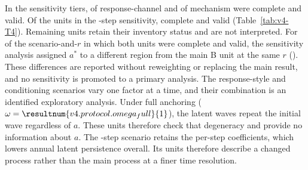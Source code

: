 In the sensitivity tiers,  of  response-channel  and  of  mechanism  were complete and valid. Of the  units in the -step sensitivity,   complete and valid (Table~\ref{tab:v4-T4}).  %
Remaining units retain their inventory status and are not interpreted. %
For  of the  scenario-and-$r$  in which both units were complete and valid, the sensitivity analysis assigned $a^*$ to a different region from the main B unit at the same $r$ (\allunitsresource). %
These differences are reported without reweighting or replacing the main result, and no sensitivity is promoted to a primary analysis. %
The response-style and conditioning scenarios vary one factor at a time, and their combination is an identified exploratory analysis. %
Under full anchoring ($\omega=\resultnum{v4.protocol.omega_full}{1}$), the latent waves repeat the initial wave regardless of $a$. These units therefore check that degeneracy and provide no information about $a$. %
The -step scenario retains the per-step coefficients, which lowers annual latent persistence overall. Its units therefore describe a changed process rather than the main process at a finer time resolution. %


